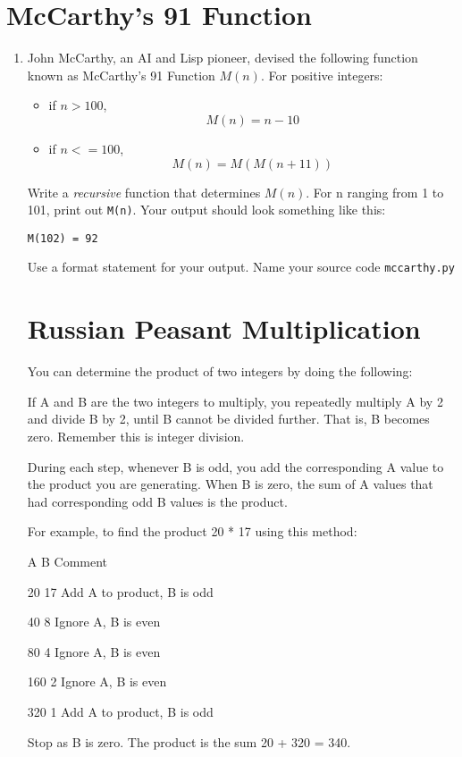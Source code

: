 \documentclass[12pt]{article}
\begin{document}
\section*{McCarthy's 91 Function}
\begin{enumerate}
  \item[]John McCarthy, an AI and Lisp pioneer, devised the following function known as McCarthy's 91 Function $M(n)$. For positive integers:
    
  \begin{itemize}
    \item[] if $n > 100$, \[M(n) = n - 10\]
    \item[] if $n <= 100$, \[M(n) = M(M(n + 11))\]
  \end{itemize}
   
  Write a \emph{recursive} function that determines $M(n)$. For n ranging from 1 to 101, print out \texttt{M(n)}. Your output should look something like this:

  \texttt{M(102) = 92}

  Use a format statement for your output. Name your source code \texttt{mccarthy.py}


\section*{Russian Peasant Multiplication}

You can determine the product of two integers by doing the following:

If A and B are the two integers to multiply, you repeatedly multiply A by 2 and divide B by 2, until B cannot be divided further. That is, B becomes zero. Remember this is integer division. 

During each step, whenever B is odd, you add the corresponding A value to the product you are generating. When B is zero, the sum of A values that had corresponding odd B values is the product.

For example, to find the product 20 * 17 using this method:

A    B   Comment 

20   17  Add A to product, B is odd

40    8  Ignore A, B is even

80    4  Ignore A, B is even

160   2  Ignore A, B is even

320   1  Add A to product, B is odd

Stop as B is zero. The product is the sum 20 + 320 = 340.


\end{enumerate}
\end{document}
